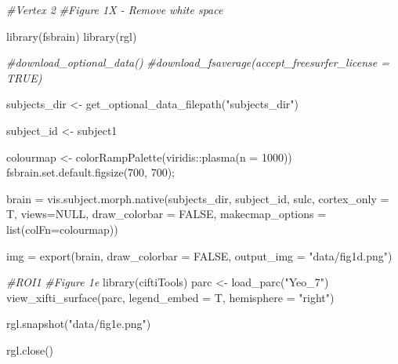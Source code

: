 \documentclass{article}
\newenvironment{Shaded}{\begin{snugshade}}{\end{snugshade}}
\newcommand{\AttributeTok}[1]{\textcolor[rgb]{0.77,0.63,0.00}{#1}}
\newcommand{\CommentTok}[1]{\textcolor[rgb]{0.56,0.35,0.01}{\textit{#1}}}
\newcommand{\ConstantTok}[1]{\textcolor[rgb]{0.00,0.00,0.00}{#1}}
\newcommand{\DecValTok}[1]{\textcolor[rgb]{0.00,0.00,0.81}{#1}}
\newcommand{\FunctionTok}[1]{\textcolor[rgb]{0.00,0.00,0.00}{#1}}
\newcommand{\NormalTok}[1]{#1}
\newcommand{\OtherTok}[1]{\textcolor[rgb]{0.56,0.35,0.01}{#1}}
\newcommand{\SpecialCharTok}[1]{\textcolor[rgb]{0.00,0.00,0.00}{#1}}
\newcommand{\StringTok}[1]{\textcolor[rgb]{0.31,0.60,0.02}{#1}}
\begin{document}
\begin{Shaded}
\begin{Highlighting}[]
\CommentTok{\#Vertex 2}
\CommentTok{\#Figure 1X {-} Remove white space}


\FunctionTok{library}\NormalTok{(fsbrain)}
\FunctionTok{library}\NormalTok{(rgl)}

\CommentTok{\#download\_optional\_data()}
\CommentTok{\#download\_fsaverage(accept\_freesurfer\_license = TRUE)}

\NormalTok{subjects\_dir }\OtherTok{\textless{}{-}} \FunctionTok{get\_optional\_data\_filepath}\NormalTok{(}\StringTok{"subjects\_dir"}\NormalTok{)}

\NormalTok{subject\_id }\OtherTok{\textless{}{-}} \StringTok{\textquotesingle{}subject1\textquotesingle{}} 

\NormalTok{colourmap }\OtherTok{\textless{}{-}} \FunctionTok{colorRampPalette}\NormalTok{(viridis}\SpecialCharTok{::}\FunctionTok{plasma}\NormalTok{(}\AttributeTok{n =} \DecValTok{1000}\NormalTok{))}
\FunctionTok{fsbrain.set.default.figsize}\NormalTok{(}\DecValTok{700}\NormalTok{, }\DecValTok{700}\NormalTok{);}

\NormalTok{brain }\OtherTok{=} \FunctionTok{vis.subject.morph.native}\NormalTok{(subjects\_dir, }
\NormalTok{                                subject\_id, }\StringTok{\textquotesingle{}sulc\textquotesingle{}}\NormalTok{, }
                                \AttributeTok{cortex\_only =}\NormalTok{ T, }
                                \AttributeTok{views=}\ConstantTok{NULL}\NormalTok{, }
                                \AttributeTok{draw\_colorbar =} \ConstantTok{FALSE}\NormalTok{,}
                                \AttributeTok{makecmap\_options =} \FunctionTok{list}\NormalTok{(}\StringTok{\textquotesingle{}colFn\textquotesingle{}}\OtherTok{=}\NormalTok{colourmap))}

\NormalTok{img }\OtherTok{=} \FunctionTok{export}\NormalTok{(brain, }\AttributeTok{draw\_colorbar =} \ConstantTok{FALSE}\NormalTok{, }\AttributeTok{output\_img =} \StringTok{"data/fig1d.png"}\NormalTok{)}
\end{Highlighting}
\end{Shaded}

\begin{Shaded}
\begin{Highlighting}[]
\CommentTok{\#ROI1 }
\CommentTok{\#Figure 1e }
\FunctionTok{library}\NormalTok{(ciftiTools)}
\NormalTok{parc }\OtherTok{\textless{}{-}} \FunctionTok{load\_parc}\NormalTok{(}\StringTok{"Yeo\_7"}\NormalTok{)}
\FunctionTok{view\_xifti\_surface}\NormalTok{(parc,  }
                   \AttributeTok{legend\_embed =}\NormalTok{ T,}
                   \AttributeTok{hemisphere =} \StringTok{"right"}\NormalTok{)}

\FunctionTok{rgl.snapshot}\NormalTok{(}\StringTok{"data/fig1e.png"}\NormalTok{)}

\FunctionTok{rgl.close}\NormalTok{()}
\end{Highlighting}
\end{Shaded}
\end{document}
